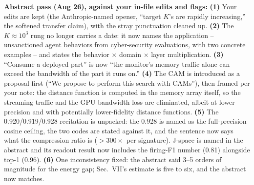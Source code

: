 \documentclass[conference]{IEEEtran}
\newcommand{\cam}{{CAM}\xspace}
\begin{document}
{\begin{pnote}[aiviolet]
\textbf{Abstract pass (Aug 26), against your in-file edits and flags:}
{\bf (1)} Your edits are kept (the Anthropic-named opener, ``target
$K$'s are rapidly increasing,'' the softened transfer claim), with the
stray punctuation cleaned up. {\bf (2)} The $K\!\approx\!10^{3}$ rung
no longer carries a date: it now names the application -- unsanctioned
agent behaviors from cyber-security evaluations, with two concrete
examples -- and states the behavior $\times$ domain $\times$ layer
multiplication. {\bf (3)} ``Consume a deployed part'' is now ``the
monitor's memory traffic alone can exceed the bandwidth of the part it
runs on.'' {\bf (4)} The \cam is introduced as a proposal first (``We
propose to perform this search with \cam{}s''), then framed per your
note: the distance function is computed in the memory array itself, so
the streaming traffic and the GPU bandwidth loss are eliminated,
albeit at lower precision and with potentially lower-fidelity distance
functions. {\bf (5)} The 0.920/0.919/0.928 recitation is unpacked: the
0.928 is named as the full-precision cosine ceiling, the two codes are
stated against it, and the sentence now says what the compression
ratio is (${>}300\times$ per signature). J-space is named in the
abstract and its readout result now includes the firing-F1 number
(0.81) alongside top-1 (0.96). {\bf (6)} One inconsistency fixed: the
abstract said 3--5 orders of magnitude for the energy gap; Sec.~VII's
estimate is five to six, and the abstract now matches.


\end{pnote}}
\end{document}
